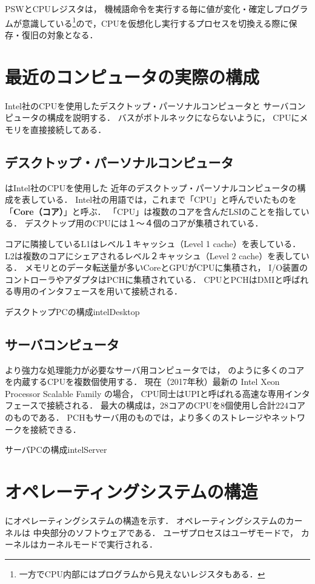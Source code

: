 PSWとCPUレジスタは，
機械語命令を実行する毎に値が変化・確定しプログラムが意識している\footnote{
一方でCPU内部にはプログラムから見えないレジスタもある．
}ので，CPUを仮想化し実行するプロセスを切換える際に保存・復旧の対象となる．

\section{最近のコンピュータの実際の構成}

Intel社のCPUを使用したデスクトップ・パーソナルコンピュータと
サーバコンピュータの構成を説明する．
バスがボトルネックにならないように，
CPUにメモリを直接接続してある．

\subsection{デスクトップ・パーソナルコンピュータ}
はIntel社のCPUを使用した
近年のデスクトップ・パーソナルコンピュータの構成を表している．
Intel社の用語では，これまで「CPU」と呼んでいたものを
「{\bf Core（コア）}」と呼ぶ．
「CPU」は複数のコアを含んだLSIのことを指している．
デスクトップ用のCPUには１〜４個のコアが集積されている．

コアに隣接しているL1はレベル１キャッシュ（Level 1 cache）を表している．
L2は複数のコアにシェアされるレベル２キャッシュ（Level 2 cache）を表している．
メモリとのデータ転送量が多いCoreとGPUがCPUに集積され，
I/O装置のコントローラやアダプタはPCHに集積されている．
CPUとPCHはDMIと呼ばれる専用のインタフェースを用いて接続される．

{デスクトップPCの構成}{intelDesktop}

\subsection{サーバコンピュータ}
より強力な処理能力が必要なサーバ用コンピュータでは，
のように多くのコアを内蔵するCPUを複数個使用する．
現在（2017年秋）最新の Intel Xeon Processor Scalable Family の場合，
CPU同士はUPIと呼ばれる高速な専用インタフェースで接続される．
最大の構成は，28コアのCPUを8個使用し合計224コアのものである．
PCHもサーバ用のものでは，より多くのストレージやネットワークを接続できる．

{サーバPCの構成}{intelServer}

\section{オペレーティングシステムの構造}
にオペレーティングシステムの構造を示す．
オペレーティングシステムのカーネルは
中央部分のソフトウェアである．
ユーザプロセスはユーザモードで，
カーネルはカーネルモードで実行される．

